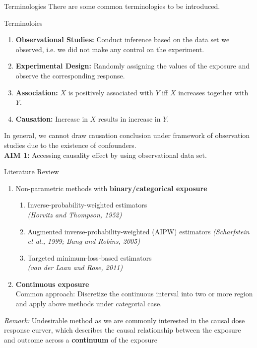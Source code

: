 \documentclass{beamer}
\begin{document}
\begin{frame}{Terminologies}
There are some common terminologies to be introduced.
\begin{block}{Terminoloies}
	\begin{enumerate}
		\item \textbf{Observational Studies:} Conduct inference based on the data set we observed, i.e. we did not make any control on the experiment.

		\item \textbf{Experimental Design:} Randomly assigning the values of the exposure and observe the corresponding response.

		\item \textbf{Association:} $X$ is positively associated with $Y$ iff $X$ increases together with $Y$.

		\item \textbf{Causation:} Increase in $X$ results in increase in $Y$.
	\end{enumerate}
\end{block}
In general, we cannot draw causation conclusion under framework of observation studies due to the existence of confounders.\\
\textbf{AIM 1:} Accessing causality effect by using observational data set.
\end{frame}

\begin{frame}{Literature Review}
	\begin{enumerate}
		\item Non-parametric methods with \textbf{binary/categorical exposure}
		\begin{enumerate}
			\item Inverse-probability-weighted estimators\\ \textit{(Horvitz and Thompson, 1952)}

			\item Augmented inverse-probability-weighted (AIPW) estimators \textit{(Scharfstein et al., 1999; Bang and Robins, 2005)}

			\item Targeted minimum-loss-based estimators \\
			\textit{(van der Laan and Rose, 2011)}
		\end{enumerate}

	    \item \textbf{Continuous exposure}\\
	    Common approach: Discretize the continuous interval into two or more region and apply above methods under categorial case.

	\end{enumerate}
	\textit{Remark:} Undesirable method as we are commonly interested in the causal dose response curver, which describes the causal relationship between the exposure and outcome across a \textbf{continuum} of the exposure
\end{frame}
\end{document}
